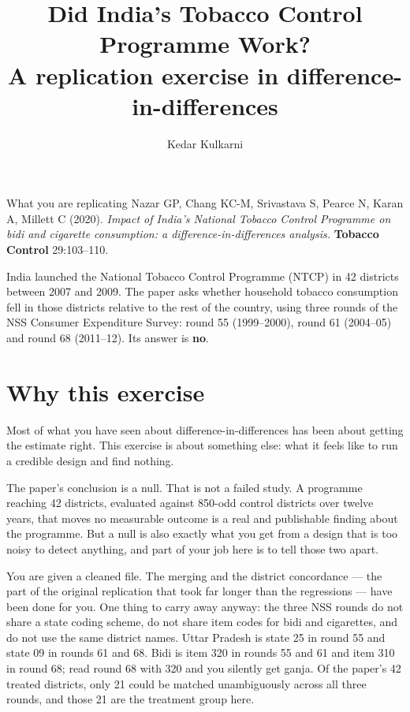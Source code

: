 \documentclass[11pt,a4paper]{article}
\title{\bfseries Did India's Tobacco Control Programme Work?\\[0.3em]
       \large A replication exercise in difference-in-differences}
\author{Kedar Kulkarni}
\date{}
\begin{document}
\maketitle
\thispagestyle{empty}

\begin{notebox}{What you are replicating}
Nazar GP, Chang KC-M, Srivastava S, Pearce N, Karan A, Millett C (2020).
\emph{Impact of India's National Tobacco Control Programme on bidi and
cigarette consumption: a difference-in-differences analysis.}
\textbf{Tobacco Control} 29:103--110.

India launched the National Tobacco Control Programme (NTCP) in 42 districts
between 2007 and 2009. The paper asks whether household tobacco consumption
fell in those districts relative to the rest of the country, using three
rounds of the NSS Consumer Expenditure Survey: round 55 (1999--2000), round 61
(2004--05) and round 68 (2011--12). Its answer is \textbf{no}.
\end{notebox}

\section*{Why this exercise}

Most of what you have seen about difference-in-differences has been about
getting the estimate right. This exercise is about something else: what it
feels like to run a credible design and find nothing.

The paper's conclusion is a null. That is not a failed study. A programme
reaching 42 districts, evaluated against 850-odd control districts over
twelve years, that moves no measurable outcome is a real and publishable
finding about the programme. But a null is also exactly what you get from a
design that is too noisy to detect anything, and part of your job here is to
tell those two apart.

You are given a cleaned file. The merging and the district concordance --- the
part of the original replication that took far longer than the regressions ---
have been done for you. One thing to carry away anyway: the three NSS rounds
do not share a state coding scheme, do not share item codes for bidi and
cigarettes, and do not use the same district names. Uttar Pradesh is state 25
in round 55 and state 09 in rounds 61 and 68. Bidi is item 320 in rounds 55
and 61 and item 310 in round 68; read round 68 with 320 and you silently get
ganja. Of the paper's 42 treated districts, only 21 could be matched
unambiguously across all three rounds, and those 21 are the treatment group
here.
\end{document}

